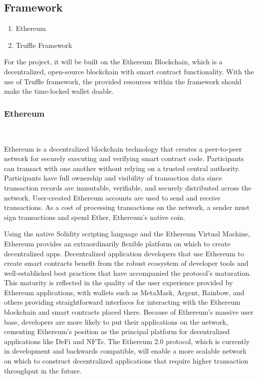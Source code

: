\documentclass[10pt,twocolumn]{article}
\begin{document}
\subsection{Framework}
\begin{enumerate}
  \item Ethereum
  \item Truffle Framework
\end{enumerate}
    
For the project, it will be built on the Ethereum Blockchain, which is a decentralized, open-source blockchain with smart contract functionality. With the use of Truffle framework, the provided resources within the framework should make the time-locked wallet doable.

\subsubsection{Ethereum}\

Ethereum is a decentralized blockchain technology that creates a peer-to-peer network for securely executing and verifying smart contract code. Participants can transact with one another without relying on a trusted central authority. Participants have full ownership and visibility of transaction data since transaction records are immutable, verifiable, and securely distributed across the network. User-created Ethereum accounts are used to send and receive transactions. As a cost of processing transactions on the network, a sender must sign transactions and spend Ether, Ethereum's native coin.

Using the native Solidity scripting language and the Ethereum Virtual Machine, Ethereum provides an extraordinarily flexible platform on which to create decentralized apps. Decentralized application developers that use Ethereum to create smart contracts benefit from the robust ecosystem of developer tools and well-established best practices that have accompanied the protocol's maturation.
This maturity is reflected in the quality of the user experience provided by Ethereum applications, with wallets such as MetaMask, Argent, Rainbow, and others providing straightforward interfaces for interacting with the Ethereum blockchain and smart contracts placed there. Because of Ethereum's massive user base, developers are more likely to put their applications on the network, cementing Ethereum's position as the principal platform for decentralized applications like DeFi and NFTs. The Ethereum 2.0 protocol, which is currently in development and backwards compatible, will enable a more scalable network on which to construct decentralized applications that require higher transaction throughput in the future.
	
\end{document}
